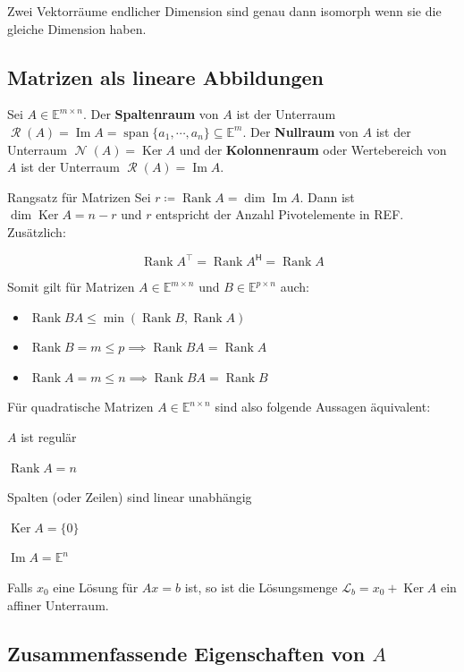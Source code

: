 \documentclass[a4paper,10pt]{article}
\DeclareMathOperator{\Rank}{Rank}
\DeclareMathOperator{\Image}{Im}
\DeclareMathOperator{\Columnspace}{\mathcal{R}}
\DeclareMathOperator{\Nullspace}{\mathcal{N}}
\DeclareMathOperator{\Kernel}{Ker}
\DeclareMathOperator{\Span}{span}
\newcommand*{\hermconj}{\mathsf{H}}
\def\E{\mathbb{E}}
\begin{document}
Zwei Vektorräume endlicher Dimension sind genau dann isomorph wenn sie die gleiche Dimension haben.

\subsection{Matrizen als lineare Abbildungen}

Sei $A \in \E^{m \times n}$. Der \textbf{Spaltenraum} von $A$ ist der Unterraum $\Columnspace(A) = \Image A = \Span \{ a_1, \cdots, a_n \} \subseteq \E^m$. Der \textbf{Nullraum} von $A$ ist der Unterraum $\Nullspace(A) = \Kernel A$ und der \textbf{Kolonnenraum} oder Wertebereich von $A$ ist der Unterraum $\Columnspace(A) = \Image A$.


\begin{subbox}{Rangsatz für Matrizen}
  Sei $r \coloneqq \Rank A = \dim \Image A$. Dann ist $\dim \Kernel A = n - r$ und $r$ entspricht der Anzahl Pivotelemente in REF. Zusätzlich:
  
  $$\Rank A^\top = \Rank A^\hermconj = \Rank A$$
\end{subbox}

Somit gilt für Matrizen $A \in \E^{m \times n}$ und $B \in \E^{p \times n}$ auch:

\begin{itemize}
  \item $\Rank BA \leq \min(\Rank B, \Rank A)$
  \item $\Rank B = m \leq p \implies \Rank BA = \Rank A$
  \item $\Rank A = m \leq n \implies \Rank BA = \Rank B$
\end{itemize}

Für quadratische Matrizen $A \in \E^{n \times n}$ sind also folgende Aussagen äquivalent:

\begin{rowlist}
  \item $A$ ist regulär
  \item $\Rank A = n$
  \item Spalten (oder Zeilen) sind linear unabhängig
  \item $\Kernel A = \{0\}$
  \item $\Image A = \E^n$
\end{rowlist}

Falls $x_0$ eine Lösung für $Ax = b$ ist, so ist die Lösungsmenge $\mathcal{L}_b = x_0 + \Kernel A$ ein affiner Unterraum.

\subsection{Zusammenfassende Eigenschaften von $A$}
\end{document}
